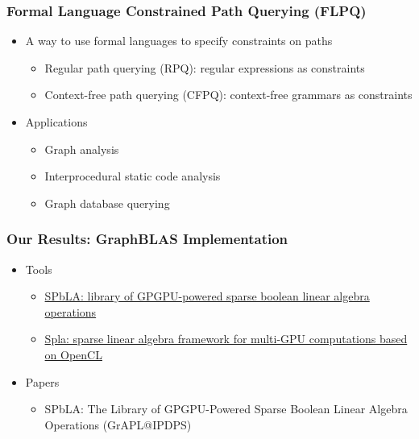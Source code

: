 \documentclass[xcolor=table,aspectratio=169]{beamer}
\begin{document}
\begin{frame}[fragile]
  \frametitle{Formal Language Constrained Path Querying (FLPQ)}
    \begin{itemize}
      \item A way to use formal languages to specify constraints on paths            
      \begin {itemize}
        \item Regular path querying (RPQ): regular expressions as constraints
        \item Context-free path querying (CFPQ): context-free grammars as constraints
      \end{itemize}
    \pause    
    \item Applications 
    \begin{itemize}
      \item Graph analysis
      \item Interprocedural static code analysis
      \item Graph database querying
    \end{itemize}
  \end{itemize}
\end{frame}

\begin{frame}[fragile]
  \frametitle{Our Results: GraphBLAS Implementation}
    \begin{itemize}
      \item Tools
      \begin{itemize}
        \item \href{https://github.com/JetBrains-Research/spbla}{SPbLA: library of GPGPU-powered sparse boolean linear algebra operations}            
        \item \href{https://github.com/JetBrains-Research/spla}{Spla: sparse linear algebra framework for multi-GPU computations based on OpenCL}        
      \end{itemize}
      \pause
      \item Papers
      \begin{itemize}
        \item SPbLA: The Library of GPGPU-Powered Sparse Boolean Linear Algebra Operations (GrAPL@IPDPS)
      \end{itemize} 
    \end{itemize}
\end{frame}
\end{document}
